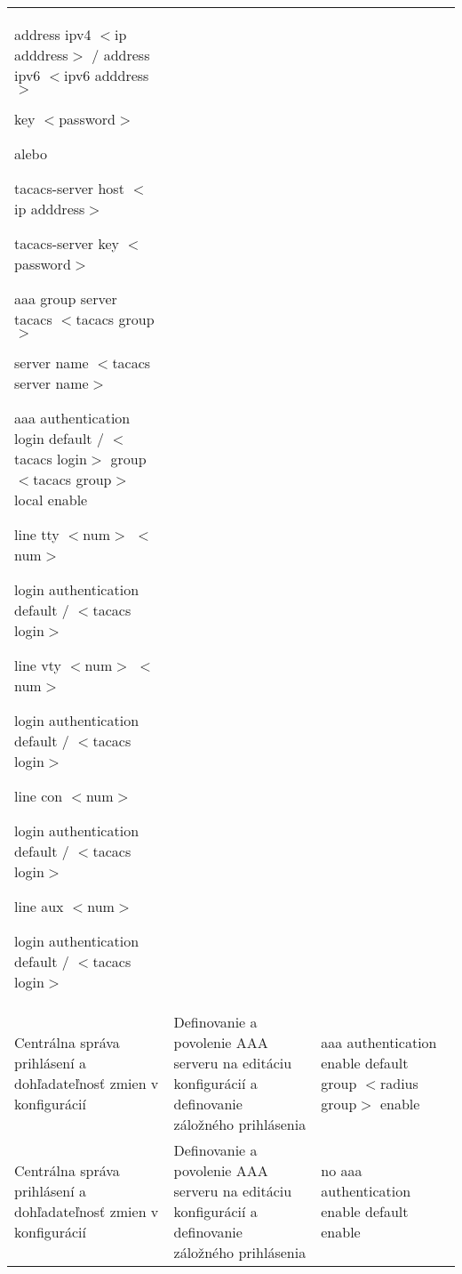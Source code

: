 \begin{longtable}[!htbp]{|L{10em}L{10em}L{34em}|}
	\hspace{0.5em}address ipv4 $<$ip adddress$>$ / address ipv6 $<$ipv6 adddress$>$
	
	\hspace{0.5em}key $<$password$>$
	\vspace{0.5em}
	
	alebo
	
	\vspace{0.5em}
	tacacs-server host $<$ip adddress$>$
	
	tacacs-server key $<$password$>$
	
	\vspace{0.5em}
	
	aaa group server tacacs $<$tacacs group$>$
	
	\hspace{0.5em}server name $<$tacacs server name$>$
	
	aaa authentication login default / $<$tacacs login$>$ group $<$tacacs group$>$ local enable
	
	line tty $<$num$>$ $<$num$>$
	
	\hspace{0.5em}login authentication default / $<$tacacs login$>$
	
	line vty $<$num$>$ $<$num$>$
	
	\hspace{0.5em}login authentication default / $<$tacacs login$>$
	
	line con $<$num$>$
	
	\hspace{0.5em}login authentication default / $<$tacacs login$>$
	
	line aux $<$num$>$
	
	
	\hspace{0.5em}login authentication default / $<$tacacs login$>$\\
	
	
	
	
	Centrálna správa prihlásení a dohľadateľnosť zmien v konfigurácií	&Definovanie a povolenie AAA serveru na editáciu konfigurácií a definovanie záložného prihlásenia	&aaa authentication enable default group $<$radius group$>$ enable\\
	
	
	
	
	 Centrálna správa prihlásení a dohľadateľnosť zmien v konfigurácií	&Definovanie a povolenie AAA serveru na editáciu konfigurácií a definovanie záložného prihlásenia	&no aaa authentication enable default enable\\
	

\end{longtable}
